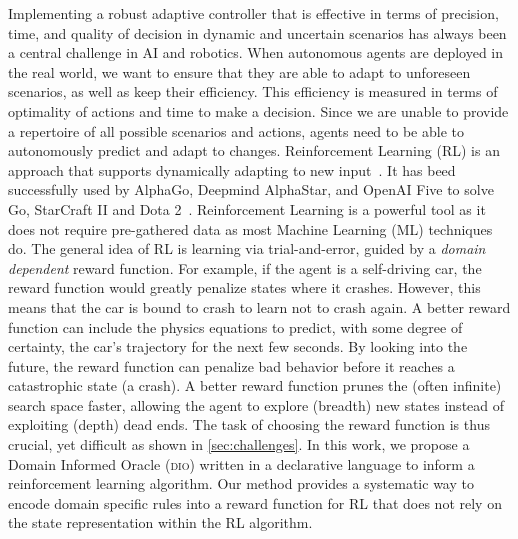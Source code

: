 \documentclass[acmsmall]{acmart}
\theoremstyle{definition}
\newcommand{\dio}{\textsc{dio}}
\begin{document}
Implementing a robust adaptive controller that is effective in terms
of precision, time, and quality of decision in dynamic and uncertain
scenarios has always been a central challenge in AI and robotics. When
autonomous agents are deployed in the real world, we want to ensure
that they are able to adapt to unforeseen scenarios, as well as keep
their efficiency. This efficiency is measured in terms of optimality
of actions and time to make a decision. 
%
Since we are unable to
provide a repertoire of all possible scenarios and actions, agents
need to be able to autonomously predict and adapt to changes.
Reinforcement Learning (RL) is an approach that supports dynamically
adapting to new input~\cite{sutton2018reinforcement}. It has beed
successfully used by AlphaGo, Deepmind AlphaStar, and OpenAI Five to
solve Go, StarCraft II and Dota 2~\cite{li2019reinforcement}.
%
Reinforcement Learning is a powerful tool as it does not require
pre-gathered data as most Machine Learning (ML) techniques do. 
%
The general idea of RL is learning via trial-and-error, guided by a
\textit{domain dependent} reward function.
%
For example, if the agent is a self-driving car, the reward function
would greatly penalize states where it crashes.
%
However, this means that the car is bound to crash to learn not to
crash again.
%
A better reward function can include the physics equations to predict,
with some degree of certainty, the car's trajectory for the next few
seconds.
%
By looking into the future, the reward function can penalize bad
behavior before it reaches a catastrophic state (a crash).
%
A better reward function prunes the (often infinite) search space
faster, allowing the agent to explore (breadth) new states instead of
exploiting (depth) dead ends.
%
The task of choosing the reward function is thus crucial, yet difficult as shown in \ref{sec:challenges}.
In this work, we propose a Domain Informed Oracle (\dio{}) written in a
declarative language to inform a reinforcement learning algorithm. 
%
Our method provides a systematic way to encode domain specific rules
into a reward function for RL that does not rely on the state
representation within the RL algorithm.




\end{document}

